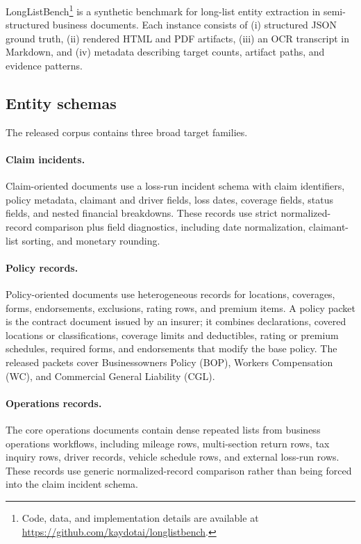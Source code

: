 LongListBench\footnote{Code, data, and implementation details are available at \url{https://github.com/kaydotai/longlistbench}.} is a synthetic benchmark for long-list entity extraction in semi-structured business documents. Each instance consists of (i) structured JSON ground truth, (ii) rendered HTML and PDF artifacts, (iii) an OCR transcript in Markdown, and (iv) metadata describing target counts, artifact paths, and evidence patterns.

\subsection{Entity schemas}
The released corpus contains three broad target families.

\paragraph{Claim incidents.}
Claim-oriented documents use a loss-run incident schema with claim identifiers, policy metadata, claimant and driver fields, loss dates, coverage fields, status fields, and nested financial breakdowns. These records use strict normalized-record comparison plus field diagnostics, including date normalization, claimant-list sorting, and monetary rounding.

\paragraph{Policy records.}
Policy-oriented documents use heterogeneous records for locations, coverages, forms, endorsements, exclusions, rating rows, and premium items. A policy packet is the contract document issued by an insurer; it combines declarations, covered locations or classifications, coverage limits and deductibles, rating or premium schedules, required forms, and endorsements that modify the base policy. The released packets cover Businessowners Policy (BOP), Workers Compensation (WC), and Commercial General Liability (CGL).

\paragraph{Operations records.}
The core operations documents contain dense repeated lists from business operations workflows, including mileage rows, multi-section return rows, tax inquiry rows, driver records, vehicle schedule rows, and external loss-run rows. These records use generic normalized-record comparison rather than being forced into the claim incident schema.

